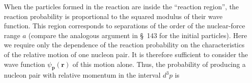 When the particles formed in the reaction are inside the ``reaction region'', the reaction probability is proportional to the squared modulus of their wave function. This region corresponds to separations of the order of the nuclear-force range $a$ (compare the analogous argument in \S~143 for the initial particles). Here we require only the dependence of the reaction probability on the characteristics of the relative motion of one nucleon pair. It is therefore sufficient to consider the wave function $\psi_{\mathbf p}(\mathbf r)$ of this motion alone. Thus, the probability of producing a nucleon pair with relative momentum in the interval $d^3p$ is
